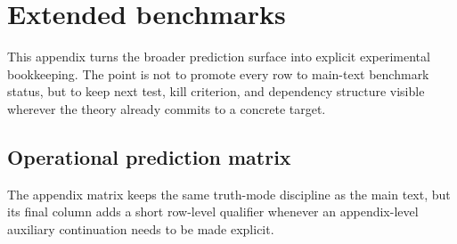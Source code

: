 \section{Extended benchmarks}
\label{app:benchmarks}

This appendix turns the broader prediction surface into explicit experimental bookkeeping. The point is not to promote every row to main-text benchmark status, but to keep next test, kill criterion, and dependency structure visible wherever the theory already commits to a concrete target.

\subsection{Operational prediction matrix}

The appendix matrix keeps the same truth-mode discipline as the main text, but its final column
adds a short row-level qualifier whenever an appendix-level auxiliary continuation needs to be
made explicit.

